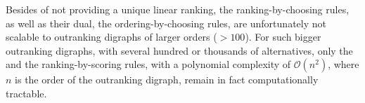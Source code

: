 Besides of not providing a unique linear ranking, the ranking-by-choosing rules, as well as their dual, the ordering-by-choosing rules, are unfortunately not scalable to outranking digraphs of larger orders ($> 100$). For such bigger outranking digraphs, with several hundred or thousands of alternatives, only the \Copeland and the \NetFlows ranking-by-scoring rules, with a polynomial complexity of $\mathcal{O}(n^2)$, where $n$ is the order of the outranking digraph, remain in fact computationally tractable.

\clearpage
{}
{}

\typeout{}

%